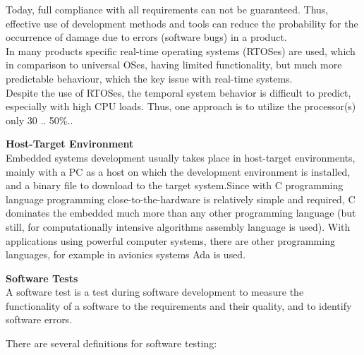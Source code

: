 Today, full compliance with all requirements can not be guaranteed. Thus, effective use of development methods and tools can reduce the probability for the occurrence of damage due to errors (software bugs) in a product.\\

In many products specific real-time operating systems (RTOSes) are used, which in comparison to universal OSes, having limited functionality, but much more predictable behaviour, which the key issue with real-time systems.\\

Despite the use of RTOSes, the temporal system behavior is difficult to predict, especially with high CPU loads. Thus, one approach is to utilize the processor(s) only 30 .. 50\%..\\

\os{\newpage}

{\rot\bf Host-Target Environment}\\

Embedded systems development usually takes place in host-target environments, mainly with a PC as a host on which the development environment is installed, and a binary file to download to the target system.Since with C programming language programming close-to-the-hardware is relatively simple and required, C dominates the embedded much more than any other programming language (but still, for computationally intensive algorithms assembly language is used). With applications using powerful computer systems, there are other programming languages, for example in avionics systems Ada is used.\\

\os{\newpage}

{\rot\bf Software Tests}\\

A software test is a test during software development to measure the functionality of a software to the requirements and their quality, and to identify software errors.


There are several definitions for software testing:\\

